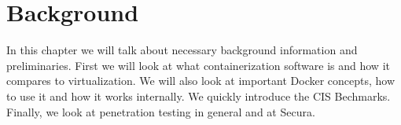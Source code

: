 \chapter{Background}

In this chapter we will talk about necessary background information and preliminaries. First we will look at what containerization software is and how it compares to virtualization. We will also look at important Docker concepts, how to use it and how it works internally. We quickly introduce the CIS Bechmarks. Finally, we look at penetration testing in general and at Secura.







